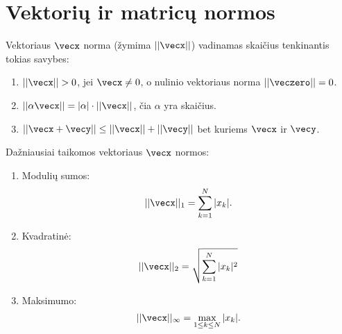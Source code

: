 



\section{Vektorių ir matricų normos}



\begin{defn}
  Vektoriaus $\vecx$ norma (žymima $||\vecx||$) vadinamas skaičius
  tenkinantis tokias savybes:
  \begin{enumerate}
    \item $||\vecx|| > 0$, jei $\vecx \neq 0$, o nulinio vektoriaus
      norma $||\veczero|| = 0$.
    \item $||\alpha \vecx|| = |\alpha|\cdot||\vecx||$, čia $\alpha$ yra
      skaičius.
    \item $||\vecx + \vecy|| \leq ||\vecx|| + ||\vecy||$ bet kuriems
      $\vecx$ ir $\vecy$.
  \end{enumerate}
\end{defn}



Dažniausiai taikomos vektoriaus $\vecx$ normos:
\begin{enumerate}
  \item Modulių sumos:
    \begin{equation*}
      ||\vecx||_{1} = \sum_{k=1}^{N}|x_{k}|.
    \end{equation*}
  \item Kvadratinė:
    \begin{equation*}
      ||\vecx||_{2} = \sqrt{\sum_{k=1}^{N}|x_{k}|^{2}}
    \end{equation*}
  \item Maksimumo:
    \begin{equation*}
      ||\vecx||_{\infty} = \max_{1 \leq k \leq N} |x_{k}|.
    \end{equation*}
\end{enumerate}

